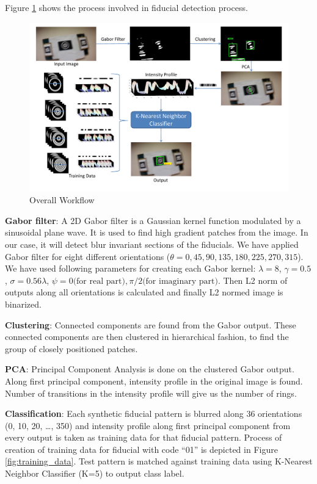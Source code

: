\documentclass[runningheads]{llncs}
\begin{document}
Figure \ref{fig:overall_flow} shows the process involved in fiducial detection
process. 

\begin{figure}
\includegraphics[width=\linewidth]{overall_flow.pdf}
\caption{Overall Workflow}
\label{fig:overall_flow}
\end{figure}

\noindent\textbf{Gabor filter}: A 2D Gabor filter is a Gaussian kernel function
modulated by a sinusoidal plane wave. It is used to find high gradient patches from the
image. In our case, it will detect blur invariant sections of the fiducials. We
have applied Gabor filter for eight different orientations ($\theta = 0, 45,
90, 135, 180, 225, 270, 315$). We have used following parameters for
creating each Gabor kernel: $\lambda = 8$, $\gamma = 0.5$, $\sigma =
0.56\lambda$, $\psi = 0 \text{(for real part)}, \pi/2 \text{(for imaginary
part)}$.
Then L2 norm of outputs along all orientations is calculated and finally L2
normed image is binarized.

\noindent\textbf{Clustering}: Connected components are found from the Gabor
output.
These connected components are then clustered in hierarchical fashion, to find
the group of closely positioned patches.

\noindent\textbf{PCA}: Principal Component Analysis is done on the clustered
Gabor output. Along first principal component, intensity profile in the original image
is found. Number of transitions in the intensity profile will give us the
number of rings.

\noindent\textbf{Classification}: Each synthetic fiducial pattern is blurred
along 36 orientations (0, 10, 20, \ldots , 350) and intensity profile along first
principal component from every output is taken as training data for that
fiducial pattern. Process of creation of training data for fiducial with
code ``01'' is depicted in Figure \ref{fig:training_data}. Test pattern is matched
against training data using K-Nearest Neighbor Classifier (K=5) to output class label.
\end{document}
